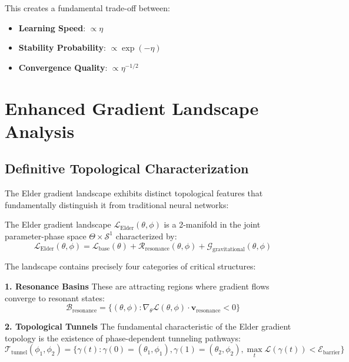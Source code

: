 This creates a fundamental trade-off between:
\begin{itemize}
    \item \textbf{Learning Speed}: $\propto \eta$
    \item \textbf{Stability Probability}: $\propto \exp(-\eta)$
    \item \textbf{Convergence Quality}: $\propto \eta^{-1/2}$
\end{itemize}

\section{Enhanced Gradient Landscape Analysis}

\subsection{Definitive Topological Characterization}

The Elder gradient landscape exhibits distinct topological features that fundamentally distinguish it from traditional neural networks:

\begin{definition}
The Elder gradient landscape $\mathcal{L}_{\text{Elder}}(\theta, \phi)$ is a 2-manifold in the joint parameter-phase space $\Theta \times \mathcal{S}^1$ characterized by:
\begin{equation}
\mathcal{L}_{\text{Elder}}(\theta, \phi) = \mathcal{L}_{\text{base}}(\theta) + \mathcal{R}_{\text{resonance}}(\theta, \phi) + \mathcal{G}_{\text{gravitational}}(\theta, \phi)
\end{equation}
\end{definition}

The landscape contains precisely four categories of critical structures:

\textbf{1. Resonance Basins}
These are attracting regions where gradient flows converge to resonant states:
\begin{equation}
\mathcal{B}_{\text{resonance}} = \{(\theta, \phi) : \nabla_\theta \mathcal{L}(\theta, \phi) \cdot \mathbf{v}_{\text{resonance}} < 0\}
\end{equation}

\textbf{2. Topological Tunnels}
The fundamental characteristic of the Elder gradient topology is the existence of phase-dependent tunneling pathways:
\begin{equation}
\mathcal{T}_{\text{tunnel}}(\phi_1, \phi_2) = \{\gamma(t) : \gamma(0) = (\theta_1, \phi_1), \gamma(1) = (\theta_2, \phi_2), \max_t \mathcal{L}(\gamma(t)) < \mathcal{E}_{\text{barrier}}\}
\end{equation}

